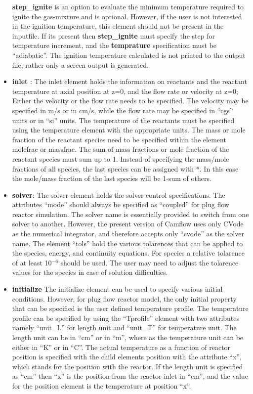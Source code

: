 \begin{itemize}
\textbf{step\_ignite} is an option to evaluate the minimum temperature required to ignite the gas-mixture and is optional. However, if the user is not interested in the ignition temperature, this element should not be present in the inputfile. If its present then \textbf{step\_ignite} must specify the step for temperature increment, and the \textbf{temprature} specification must be ``adiabatic''. The ignition temperature calculated is not printed to the output file, rather only a screen output is generated.\\

\item \textbf{inlet} : The inlet element holds the information on reactants and the reactant temperature at axial position at z=0, and the flow rate or velocity at z=0; Either the velocity or the flow rate needs to be specified. The velocity may be specified in m/s or in cm/s, while the flow rate may be specified in ``cgs'' units or in ``si'' units. The temperature of the reactants must be specified using the temperature element with the appropriate units. The mass or mole fraction of the reactant species need to be specified within the element molefrac or massfrac. The sum of mass fractions or mole fraction of the reactant species must sum up to 1. Instead of specifying the mass/mole fractions of all species, the last species can be assigned with *. In this case the mole/mass fraction of the last species will be 1-sum of others.

\item \textbf{solver}: The solver element holds the solver control specifications. The attributes ``mode'' should always be specified as ``coupled'' for plug flow reactor simulation. The solver name is essentially provided to switch from one solver to another. However, the present version of Camflow uses only CVode as the numerical integrator, and therefore accepts only ``cvode'' as the solver name. The element ``tols'' hold the various tolarences that can be applied to the species, energy, and continuity equations. For species a relative tolarence of at least 10$^{-6}$ should be used. The user may need to adjust the tolarence values for the species in case of solution difficulties.

\item \textbf{initialize} The initialize element can be used to specify various initial conditions. However, for plug flow reactor model, the only initial property that can be specified is the user defined temperature profile. The temperature profile can be specified by using the ``Tprofile'' element with two attributes namely ``unit\_L'' for length unit and ``unit\_T'' for temperature unit. The length unit can be in ``cm'' or in ``m'', where as the temperature unit can be either in ``K'' or in ``C''. The actual temperature as a function of reactor position is specified with the child elements position with the attribute ``x'', which stands for the position with the reactor. If the length unit is specified as ``cm'' then ``x'' is the position from the reactor inlet in ``cm'', and the value for the position element is the temperature at position ``x''.


\end{itemize}
